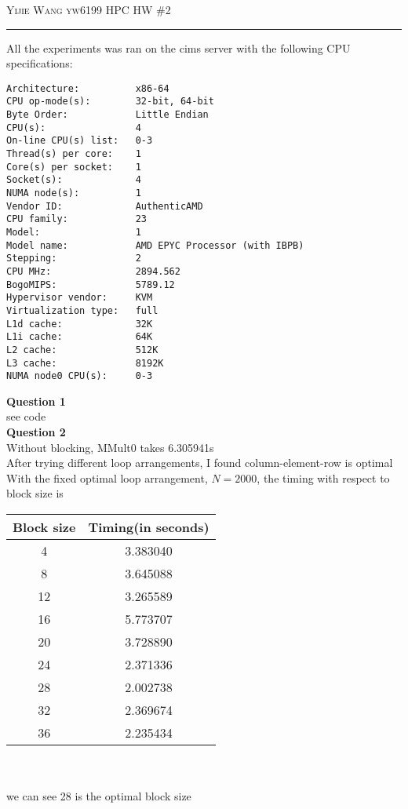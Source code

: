 \documentclass[12pt]{amsart}
\begin{document}
\thispagestyle{empty}

{\scshape Yijie Wang yw6199} \hfill {\scshape \large HPC} \hfill {HW \#2\scshape }
 

\hrule
\smallskip
All the experiments was ran on the cims server with the following CPU specifications:
\begin{verbatim}
Architecture:          x86-64
CPU op-mode(s):        32-bit, 64-bit
Byte Order:            Little Endian
CPU(s):                4
On-line CPU(s) list:   0-3
Thread(s) per core:    1
Core(s) per socket:    1
Socket(s):             4
NUMA node(s):          1
Vendor ID:             AuthenticAMD
CPU family:            23
Model:                 1
Model name:            AMD EPYC Processor (with IBPB)
Stepping:              2
CPU MHz:               2894.562
BogoMIPS:              5789.12
Hypervisor vendor:     KVM
Virtualization type:   full
L1d cache:             32K
L1i cache:             64K
L2 cache:              512K
L3 cache:              8192K
NUMA node0 CPU(s):     0-3
\end{verbatim}
\textbf{Question 1} \\
see code\\
\break
\textbf{Question 2} \\
Without blocking, MMult0 takes 6.305941s\\
After trying different loop arrangements, I found column-element-row is optimal\\
With the fixed optimal loop arrangement, $N=2000$, the timing with respect to block size is
\vskip0.2cm
\begin{tabular}{|c |c|} 
 \hline
 Block size & Timing(in seconds) \\ [0.5ex] 
 \hline
 4 & 3.383040 \\
 \hline
 8 & 3.645088 \\ 
 \hline
 12 & 3.265589 \\
 \hline
 16 & 5.773707 \\
 \hline
 20 & 3.728890 \\
 \hline
 24 & 2.371336 \\
 \hline
 28 & 2.002738 \\
 \hline
 32 & 2.369674 \\
 \hline
 36 & 2.235434\\ [1ex] 
 \hline
\end{tabular}
\\\\
we can see 28 is the optimal block size
\\\\
\end{document}
